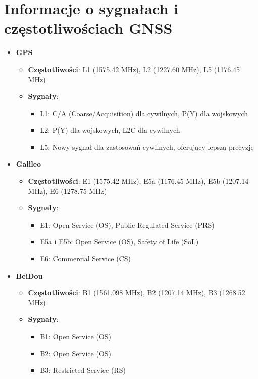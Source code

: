 \section{Informacje o sygnałach i częstotliwościach GNSS}
\begin{itemize}
    \item \textbf{GPS}
    \begin{itemize}
        \item \textbf{Częstotliwości}: L1 (1575.42 MHz), L2 (1227.60 MHz), L5 (1176.45 MHz)
        \item \textbf{Sygnały}:
        \begin{itemize}
            \item L1: C/A (Coarse/Acquisition) dla cywilnych, P(Y) dla wojskowych
            \item L2: P(Y) dla wojskowych, L2C dla cywilnych
            \item L5: Nowy sygnał dla zastosowań cywilnych, oferujący lepszą precyzję
        \end{itemize}
    \end{itemize}

    \item \textbf{Galileo}
    \begin{itemize}
        \item \textbf{Częstotliwości}: E1 (1575.42 MHz), E5a (1176.45 MHz), E5b (1207.14 MHz), E6 (1278.75 MHz)
        \item \textbf{Sygnały}:
        \begin{itemize}
            \item E1: Open Service (OS), Public Regulated Service (PRS)
            \item E5a i E5b: Open Service (OS), Safety of Life (SoL)
            \item E6: Commercial Service (CS)
        \end{itemize}
    \end{itemize}

    \item \textbf{BeiDou}
    \begin{itemize}
        \item \textbf{Częstotliwości}: B1 (1561.098 MHz), B2 (1207.14 MHz), B3 (1268.52 MHz)
        \item \textbf{Sygnały}:
        \begin{itemize}
            \item B1: Open Service (OS)
            \item B2: Open Service (OS)
            \item B3: Restricted Service (RS)
        \end{itemize}
    \end{itemize}


\end{itemize}
